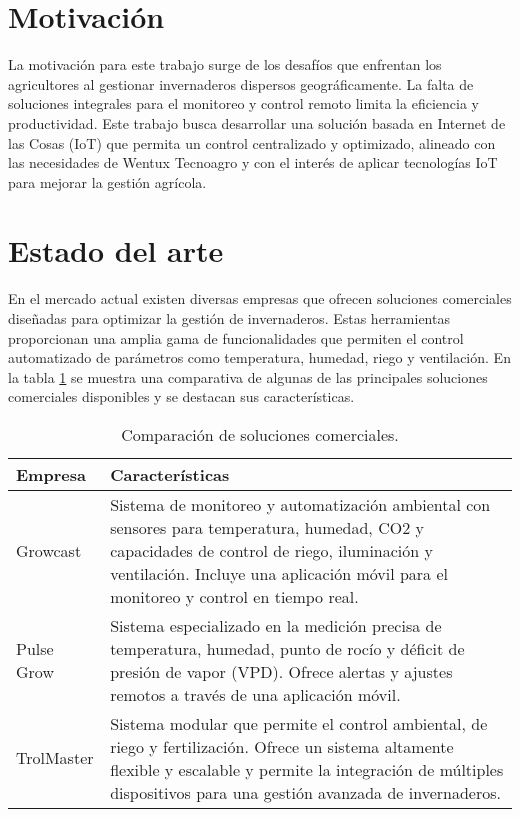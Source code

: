 
\section{Motivación}

La motivación para este trabajo surge de los desafíos que enfrentan los agricultores al gestionar invernaderos dispersos geográficamente. La falta de soluciones integrales para el monitoreo y control remoto limita la eficiencia y productividad. Este trabajo busca desarrollar una solución basada en Internet de las Cosas (IoT) que permita un control centralizado y optimizado, alineado con las necesidades de Wentux Tecnoagro \citep{wentux} y con el interés de aplicar tecnologías IoT para mejorar la gestión agrícola.


\section{Estado del arte}
En el mercado actual existen diversas empresas que ofrecen soluciones comerciales diseñadas para optimizar la gestión de invernaderos. Estas herramientas proporcionan una amplia gama de funcionalidades que permiten el control automatizado de parámetros como temperatura, humedad, riego y ventilación. En la tabla \ref{tabla:empresas_invernaderos} se muestra una comparativa de algunas de las principales soluciones comerciales disponibles y se destacan sus características.

\begin{table}[h]
	\centering
	\caption[Comparación de soluciones comerciales]{Comparación de soluciones comerciales.}
	\begin{tabular}{l p{10cm}}    
		\toprule
		\textbf{Empresa} 	 & \textbf{Características}  \\
		\midrule
		Growcast \citep{Growcast} & Sistema de monitoreo y automatización ambiental con sensores para temperatura, humedad, CO2 y capacidades de control de riego, iluminación y ventilación. Incluye una aplicación móvil para el monitoreo y control en tiempo real. \\		
		Pulse Grow \citep{pulsegrow}	 & Sistema especializado en la medición precisa de temperatura, humedad, punto de rocío y déficit de presión de vapor (VPD). Ofrece alertas y ajustes remotos a través de una aplicación móvil. \\
		TrolMaster \citep{trolmaster}	 & Sistema modular que permite el control ambiental, de riego y fertilización. Ofrece un sistema altamente flexible y escalable y permite la integración de múltiples dispositivos para una gestión avanzada de invernaderos. \\
		\bottomrule
	\end{tabular}
	\label{tabla:empresas_invernaderos}
\end{table}


